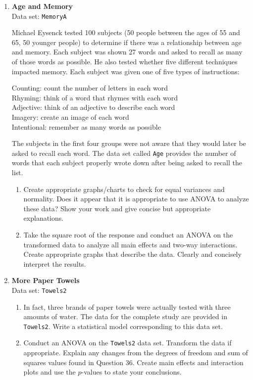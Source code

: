 \documentclass[
]{report}
\begin{document}
\begin{enumerate}
  \item \textbf{Age and Memory}\\
  Data set: \texttt{MemoryA}

Michael Eysenck tested 100 subjects (50 people between the ages of 55 and 65, 50 younger people) to determine if there was a relationship between age and memory. Each subject was shown 27 words and asked to recall as many of those words as possible. He also tested whether five different techniques impacted memory. Each subject was given one of five types of instructions:

Counting: count the number of letters in each word \\
Rhyming: think of a word that rhymes with each word \\
Adjective: think of an adjective to describe each word \\
Imagery: create an image of each word \\
Intentional: remember as many words as possible

The subjects in the first four groups were not aware that they would later be asked to recall each word. The data set called \texttt{Age} provides the number of words that each subject properly wrote down after being asked to recall the list.

  \begin{enumerate}
    \item Create appropriate graphs/charts to check for equal variances and normality. Does it appear that it is appropriate to use ANOVA to analyze these data? Show your work and give concise but appropriate explanations.
    \item Take the square root of the response and conduct an ANOVA on the transformed data to analyze all main effects and two-way interactions. Create appropriate graphs that describe the data. Clearly and concisely interpret the results.
  \end{enumerate}

  \item \textbf{More Paper Towels}\\
  Data set: \texttt{Towels2}
  \begin{enumerate}
    \item In fact, three brands of paper towels were actually tested with three amounts of water. The data for the complete study are provided in \texttt{Towels2}. Write a statistical model corresponding to this data set.
    \item Conduct an ANOVA on the \texttt{Towels2} data set. Transform the data if appropriate. Explain any changes from the degrees of freedom and sum of squares values found in Question 36. Create main effects and interaction plots and use the $p$-values to state your conclusions.
  \end{enumerate}


\end{enumerate}
\end{document}
